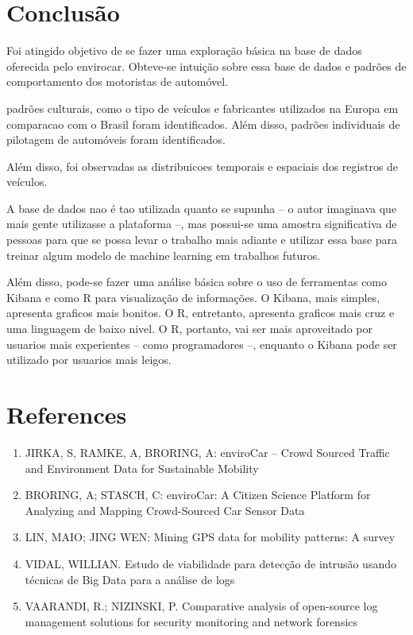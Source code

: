 \documentclass[10pt, conference]{IEEEtran}
\begin{document}
\section{Conclusão}
%

Foi atingido objetivo de se fazer uma exploração básica na base de dados oferecida pelo envirocar. Obteve-se 
intuição sobre essa base de dados e padrões de comportamento dos motoristas de automóvel. 

padrões culturais,
como o tipo de veículos e fabricantes utilizados na Europa em comparacao com o Brasil foram identificados. 
Além disso, padrões individuais de pilotagem de automóveis foram identificados. 

Além disso, foi observadas as distribuicoes temporais e espaciais dos registros de veículos.

A base de dados nao é tao utilizada quanto se supunha -- o autor imaginava que mais gente utilizasse a
plataforma --, mas possui-se uma amostra significativa de pessoas para que se possa levar o trabalho
mais adiante e utilizar essa base para treinar algum modelo de machine learning em trabalhos futuros.

Além disso, pode-se fazer uma análise básica sobre o uso de ferramentas como Kibana e como R para
visualização de informações. O Kibana, mais simples, apresenta graficos mais bonitos. O R, entretanto,
apresenta graficos mais cruz e uma linguagem de baixo nivel. O R, portanto, vai ser mais aproveitado
por usuarios mais experientes -- como programadores --, enquanto o Kibana pode ser utilizado por usuarios
mais leigos.



\iffinal
\section*{References}
%

\begin{enumerate}
  \item JIRKA, S, RAMKE, A, BRORING, A: enviroCar – Crowd Sourced Traffic and Environment Data for Sustainable Mobility
  \item BRORING, A; STASCH, C: enviroCar:  A Citizen Science Platform  for Analyzing and Mapping Crowd-Sourced Car Sensor  Data
  \item LIN, MAIO; JING WEN: Mining GPS data  for mobility  patterns: A survey
  \item VIDAL, WILLIAN. Estudo de viabilidade para detecção de intrusão usando técnicas de Big Data para a análise de logs
  \item VAARANDI, R.; NIZINSKI, P. Comparative analysis of open-source log management solutions for security monitoring and network forensics
\end{enumerate}
\end{document}
